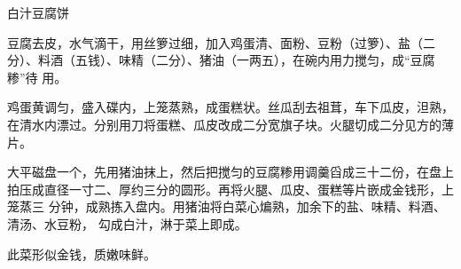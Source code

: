 \begin{recipe}[金钱豆腐]{白汁豆腐饼}

\ingredients


\preparation

\step 豆腐去皮，水气滴干，用丝箩过细，加入鸡蛋清、面粉、豆粉（过箩）、盐（二
分）、料酒（五钱）、味精（二分）、猪油（一两五），在碗内用力搅匀，成“豆腐糁”待
用。

\step 鸡蛋黄调匀，盛入碟内，上笼蒸熟，成蛋糕状。丝瓜刮去祖茸，车下瓜皮，泹熟，
在清水内漂过。分别用刀将蛋糕、瓜皮改成二分宽旗子块。火腿切成二分见方的薄片。

\step 大平磁盘一个，先用猪油抹上，然后把搅匀的豆腐糁用调羹舀成三十二份，在盘上
拍压成直径一寸二、厚约三分的圆形。再将火腿、瓜皮、蛋糕等片嵌成金钱形，上笼蒸三
分钟，成熟拣入盘内。用猪油将白菜心煸熟，加余下的盐、味精、料酒、清汤、水豆粉，
勾成白汁，淋于菜上即成。

\features

此菜形似金钱，质嫩味鲜。

\end{recipe}


